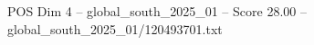 \begin{textsample}{POS Dim 4 – global\_south\_2025\_01 – Score 28.00 – global\_south\_2025\_01/120493701.txt}
\end{textsample}
